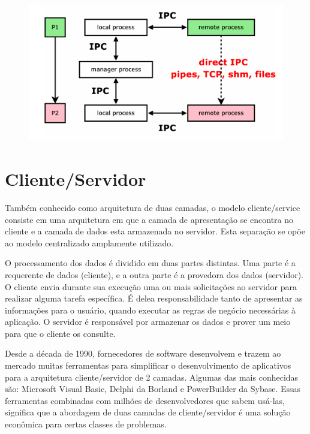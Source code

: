 \begin{figure}[ht]
    \centering
    \includegraphics[width=1\textwidth]{figuras/ipc.png}
    \label{fig:how-communication-works}
\end{figure}

\section{Cliente/Servidor}\label{sec:clientserver}

Também conhecido como arquitetura de duas camadas, o modelo cliente/service consiste em uma arquitetura em que a camada de apresentação se encontra no cliente e a camada de dados esta armazenada no servidor. Esta separação se opõe ao modelo centralizado amplamente utilizado.

O processamento dos dados é dividido em duas partes distintas. Uma parte é a requerente de dados (cliente), e a outra parte é a provedora dos dados (servidor). O cliente envia durante sua execução uma ou mais solicitações ao servidor para realizar alguma tarefa específica. É delea responsabilidade tanto de apresentar as informações para o usuário, quando executar as regras de negócio necessárias à aplicação. O servidor é responsável por armazenar os dados e prover um meio para que o cliente os consulte.

Desde a década de 1990, fornecedores de software desenvolvem e trazem ao mercado muitas ferramentas para simplificar o desenvolvimento de aplicativos para a arquitetura cliente/servidor de 2 camadas. Algumas das mais conhecidas são: Microsoft Visual Basic, Delphi da Borland e PowerBuilder da Sybase. Essas ferramentas combinadas com milhões de desenvolvedores que sabem usá-las, significa que a abordagem de duas camadas de cliente/servidor é uma solução econômica para certas classes de problemas.

